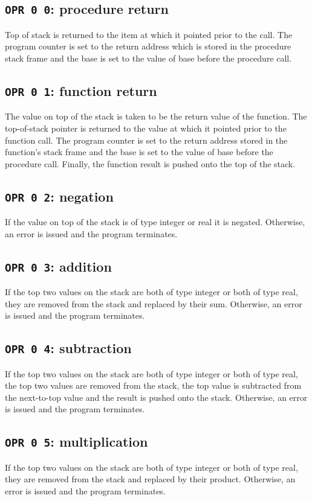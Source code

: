 \documentclass[a4paper,10pt]{report}
\begin{document}
\setcounter{subsubsection}{-1}
\subsection{\texttt{OPR 0 0}: procedure return}
Top of stack is returned to the item at which it pointed prior to the
call.  The program counter is set to the return address which is
stored in the procedure stack frame and the base is set to the value
of base before the procedure call.

\subsection{\texttt{OPR 0 1}: function return}
The value on top of the stack is taken to be the return value of the
function.  The top-of-stack pointer is returned to the value at which
it pointed prior to the function call.  The program counter is set to
the return address stored in the function's stack frame and the base
is set to the value of base before the procedure call.  Finally, the
function result is pushed onto the top of the stack.

\subsection{\texttt{OPR 0 2}: negation}
If the value on top of the stack is of type integer or real it is
negated.  Otherwise, an error is issued and the program terminates.

\subsection{\texttt{OPR 0 3}: addition}
If the top two values on the stack are both of type integer or both of
type real, they are removed from the stack and replaced by their sum.
Otherwise, an error is issued and the program terminates.

\subsection{\texttt{OPR 0 4}: subtraction}
If the top two values on the stack are both of type integer or both of
type real, the top two values are removed from the stack, the top
value is subtracted from the next-to-top value and the result is
pushed onto the stack.  Otherwise, an error is issued and the program
terminates.

\subsection{\texttt{OPR 0 5}: multiplication}
If the top two values on the stack are both of type integer or both of
type real, they are removed from the stack and replaced by their
product.  Otherwise, an error is issued and the program terminates.
\end{document}

